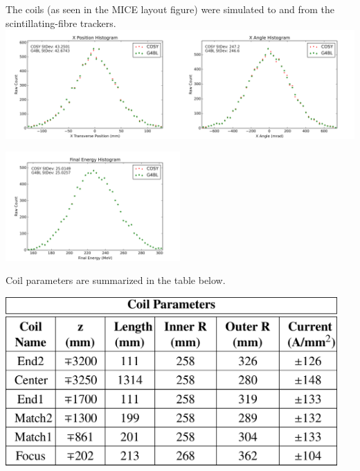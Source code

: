 \documentclass[portrait,a0paper,fontscale=0.285]{baposter} %
\begin{document}
\begin{poster}
{The coils (as seen in the MICE layout figure) were simulated to and from the scintillating-fibre trackers.\\
\includegraphics[width=0.5\textwidth]{Figures/coil tests/xposition}\includegraphics[width=0.5\textwidth]{Figures/coil tests/xangle}
\begin{center} \includegraphics[width=0.5\textwidth]{Figures/coil tests/energy} \end{center}
Coil parameters are summarized in the table below.
\begin{center} \includegraphics[width=0.95\textwidth]{Figures/coiltable} \end{center}
}


\end{poster}
\end{document}
